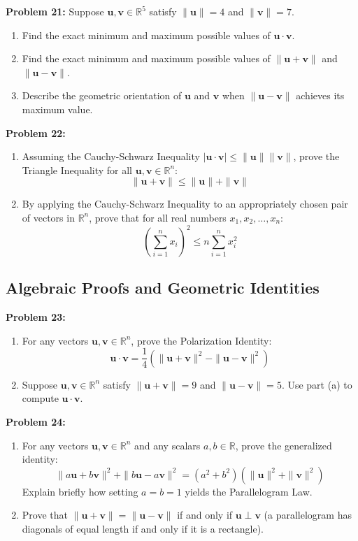 \documentclass[11pt, letterpaper]{article}
\theoremstyle{definition}
\theoremstyle{remark}
\begin{document}
\textbf{Problem 21:} Suppose $\mathbf{u}, \mathbf{v} \in \mathbb{R}^5$ satisfy $\|\mathbf{u}\| = 4$ and $\|\mathbf{v}\| = 7$.
\begin{enumerate}[label=(\alph*)]
    \item Find the exact minimum and maximum possible values of $\mathbf{u} \cdot \mathbf{v}$.
    \item Find the exact minimum and maximum possible values of $\|\mathbf{u} + \mathbf{v}\|$ and $\|\mathbf{u} - \mathbf{v}\|$.
    \item Describe the geometric orientation of $\mathbf{u}$ and $\mathbf{v}$ when $\|\mathbf{u} - \mathbf{v}\|$ achieves its maximum value.
\end{enumerate}

\textbf{Problem 22:}
\begin{enumerate}[label=(\alph*)]
    \item Assuming the Cauchy-Schwarz Inequality $|\mathbf{u} \cdot \mathbf{v}| \le \|\mathbf{u}\|\|\mathbf{v}\|$, prove the Triangle Inequality for all $\mathbf{u}, \mathbf{v} \in \mathbb{R}^n$:
    \[
    \|\mathbf{u} + \mathbf{v}\| \le \|\mathbf{u}\| + \|\mathbf{v}\|
    \]
    \item By applying the Cauchy-Schwarz Inequality to an appropriately chosen pair of vectors in $\mathbb{R}^n$, prove that for all real numbers $x_1, x_2, \dots, x_n$:
    \[
    \left(\sum_{i=1}^{n} x_i\right)^2 \le n \sum_{i=1}^{n} x_i^2
    \]
\end{enumerate}

\subsection{Algebraic Proofs and Geometric Identities}

\textbf{Problem 23:}
\begin{enumerate}[label=(\alph*)]
    \item For any vectors $\mathbf{u}, \mathbf{v} \in \mathbb{R}^n$, prove the Polarization Identity:
    \[
    \mathbf{u} \cdot \mathbf{v} = \frac{1}{4}\left(\|\mathbf{u} + \mathbf{v}\|^2 - \|\mathbf{u} - \mathbf{v}\|^2\right)
    \]
    \item Suppose $\mathbf{u}, \mathbf{v} \in \mathbb{R}^n$ satisfy $\|\mathbf{u} + \mathbf{v}\| = 9$ and $\|\mathbf{u} - \mathbf{v}\| = 5$. Use part (a) to compute $\mathbf{u} \cdot \mathbf{v}$.
\end{enumerate}

\textbf{Problem 24:}
\begin{enumerate}[label=(\alph*)]
    \item For any vectors $\mathbf{u}, \mathbf{v} \in \mathbb{R}^n$ and any scalars $a, b \in \mathbb{R}$, prove the generalized identity:
    \[
    \|a\mathbf{u} + b\mathbf{v}\|^2 + \|b\mathbf{u} - a\mathbf{v}\|^2 = (a^2 + b^2)\left(\|\mathbf{u}\|^2 + \|\mathbf{v}\|^2\right)
    \]
    Explain briefly how setting $a = b = 1$ yields the Parallelogram Law.
    \item Prove that $\|\mathbf{u} + \mathbf{v}\| = \|\mathbf{u} - \mathbf{v}\|$ if and only if $\mathbf{u} \perp \mathbf{v}$ (a parallelogram has diagonals of equal length if and only if it is a rectangle).
\end{enumerate}
\end{document}
